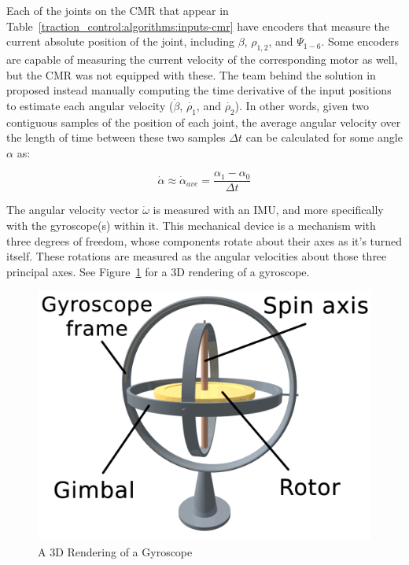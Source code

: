 Each of the joints on the \ac{CMR} that appear in Table~\ref{traction_control:algorithms:inputs-cmr} have encoders that measure the current absolute position of the joint, including $\beta$, $\rho_{1,2}$, and $\Psi_{1-6}$. Some encoders are capable of measuring the current velocity of the corresponding motor as well, but the \ac{CMR} was not equipped with these. The team behind the solution in \cite{tractl} proposed instead manually computing the time derivative of the input positions to estimate each angular velocity ($\dot{\beta}$, $\dot{\rho_{1}}$, and $\dot{\rho_{2}}$). In other words, given two contiguous samples of the position of each joint, the average angular velocity over the length of time between these two samples $\Delta t$ can be calculated for some angle $\alpha$ as:

\begin{equation}
	\dot{\alpha} \approx \dot{\alpha}_{ave} = \frac{\alpha_{1} - \alpha_{0}}{\Delta t}
\end{equation}

The angular velocity vector $\dot{\omega}$ is measured with an \ac{IMU}, and more specifically with the gyroscope(s) within it. This mechanical device is a mechanism with three degrees of freedom, whose components rotate about their axes as it's turned itself. These rotations are measured as the angular velocities about those three principal axes. See Figure~\ref{traction_control:algorithms:gyro} for a 3D rendering of a gyroscope.

\begin{figure}[H]
	\centering
	\includegraphics[width=.35\textwidth]{sections/algorithms/images/gyroscope.png}
	\caption{A 3D Rendering of a Gyroscope}
	\label{traction_control:algorithms:gyro}
\end{figure}
